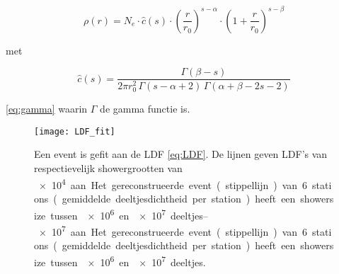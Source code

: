 \begin{equation}
\rho(r) = N_e \cdot \hat{c}(s) \cdot \left(\frac{r}{r_0}\right)^{s-\alpha} \cdot \left(1 + \frac{r}{r_0}\right)^{s-\beta}
\label{eq:LDF}
\end{equation}

met

\begin{equation}
\hat{c}(s) = \frac{\Gamma(\beta-s)}{2\pi r_0^2 \, \Gamma(s-\alpha+2) \, \Gamma(\alpha+\beta-2s-2)}
\label{eq:gamma}
\end{equation}

\eqref{eq:gamma} waarin $\Gamma$ de gamma functie is.

\begin{figure}
    \centering
    \texttt{[image: LDF\_fit]}
    \caption{Een event is gefit aan de LDF \eqref{eq:LDF}. De lijnen geven
    LDF’s van respectievelijk showergrootten van \SIrange{e4}{e7} aan. Het
    gereconstrueerde event (stippellijn) van 6 stations (gemiddelde deeltjesdichtheid
    per station) heeft een showersize tussen \SI{e6} en \SI{e7} deeltjes.}
    \label{fig:LDF_fit}
\end{figure} 



